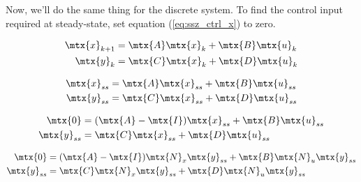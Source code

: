 Now, we'll do the same thing for the discrete \gls{system}. To find the
\gls{control input} required at steady-state, set equation (\ref{eq:ssz_ctrl_x})
to zero.

\begin{align*}
  \mtx{x}_{k+1} &= \mtx{A}\mtx{x}_k + \mtx{B}\mtx{u}_k \\
  \mtx{y}_k &= \mtx{C}\mtx{x}_k + \mtx{D}\mtx{u}_k
\end{align*}

\begin{align*}
  \mtx{x}_{ss} &= \mtx{A}\mtx{x}_{ss} + \mtx{B}\mtx{u}_{ss} \\
  \mtx{y}_{ss} &= \mtx{C}\mtx{x}_{ss} + \mtx{D}\mtx{u}_{ss}
\end{align*}

\begin{align*}
  \mtx{0} &= (\mtx{A} - \mtx{I})\mtx{x}_{ss} + \mtx{B}\mtx{u}_{ss} \\
  \mtx{y}_{ss} &= \mtx{C}\mtx{x}_{ss} + \mtx{D}\mtx{u}_{ss}
\end{align*}

\begin{align*}
  \mtx{0} &= (\mtx{A} - \mtx{I})\mtx{N}_x\mtx{y}_{ss} +
    \mtx{B}\mtx{N}_u\mtx{y}_{ss} \\
  \mtx{y}_{ss} &= \mtx{C}\mtx{N}_x\mtx{y}_{ss} + \mtx{D}\mtx{N}_u\mtx{y}_{ss}
\end{align*}

